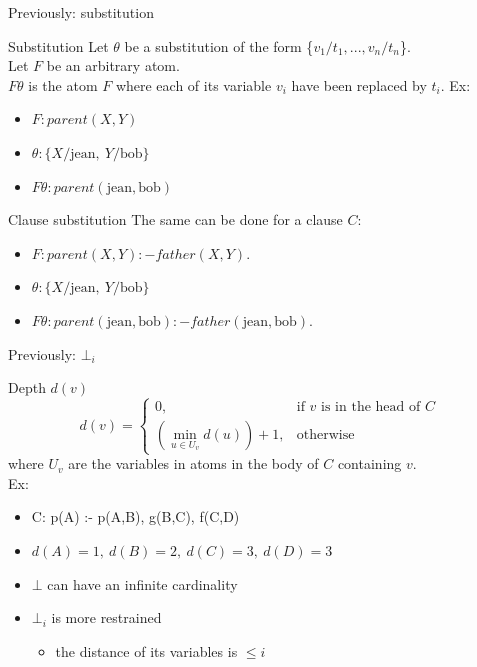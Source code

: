 \begin{frame}{Previously: substitution}
    
\begin{block}{Substitution}
Let $\theta$ be a substitution of the form \{$v_1/t_1, ..., v_n/t_n$\}. \\
Let $F$ be an arbitrary atom. \\
$F\theta$ is the atom $F$ where each of its variable $v_i$ have been replaced by $t_i$.
Ex: 
\begin{itemize}
    \item $F: parent(X,Y)$
    \item $\theta: \{X/\text{jean},\ Y/\text{bob}\}$
    \item $F\theta: parent(\text{jean},\text{bob})$
\end{itemize}
\end{block}

\begin{block}{Clause substitution}
The same can be done for a clause $C$:
\begin{itemize}
    \item $F: parent(X,Y) :- father(X,Y).$
    \item $\theta: \{X/\text{jean},\ Y/\text{bob}\}$
    \item $F\theta: parent(\text{jean},\text{bob}) :- father(\text{jean},\text{bob}).$
\end{itemize}
\end{block}
    
\end{frame}

\begin{frame}{Previously: $\bot_i$}

\begin{block}{Depth $d(v)$}
\[
    d(v) = 
\begin{cases}
    0, & \text{if } v \text{ is in the head of }C\\
    (\min_{u\in U_v} d(u)) +1,              & \text{otherwise}
\end{cases}
\] where $U_v$ are the variables in atoms in the body of $C$ containing $v$.\\
Ex:
\begin{itemize}
    \item C: p(A) :- p(A,B), g(B,C), f(C,D)
    \item $d(A)=1, \ d(B)=2, \ d(C)=3, \ d(D)=3$
\end{itemize}
\end{block}

\begin{itemize}
    \item $\bot$ can have an infinite cardinality
    \item $\bot_i$ is more restrained
    \begin{itemize}
        \item the distance of its variables is $\leq i$
    \end{itemize}
\end{itemize}
    
\end{frame}

